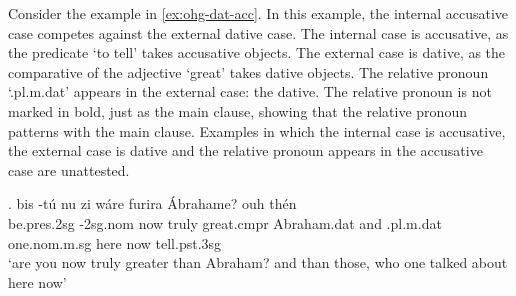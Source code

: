 %


Consider the example in \ref{ex:ohg-dat-acc}. In this example, the internal accusative case competes against the external dative case.
The internal case is accusative, as the predicate  `to tell' takes accusative objects.
The external case is dative, as the comparative of the adjective  `great' takes dative objects.
The relative pronoun  `.\ac{pl}.\ac{m}.\ac{dat}' appears in the external case: the dative. The relative pronoun is not marked in bold, just as the main clause, showing that the relative pronoun patterns with the main clause.
Examples in which the internal case is accusative, the external case is dative and the relative pronoun appears in the accusative case are unattested.

\exg. bis -tú nu {zi wáre} furira Ábrahame? ouh thén    \\
be.\ac{pres}.2\ac{sg} -2\ac{sg}.\ac{nom} now truly {great}.\ac{cmpr}\scsub{[dat]} Abraham.\ac{dat} and .\ac{pl}.\ac{m}.\ac{dat} one.\ac{nom}.\ac{m}.\ac{sg} here now tell.\ac{pst}.3\ac{sg}\scsub{[acc]}\\
`are you now truly greater than Abraham? and than those, who one talked about here now' \label{ex:ohg-dat-acc}

